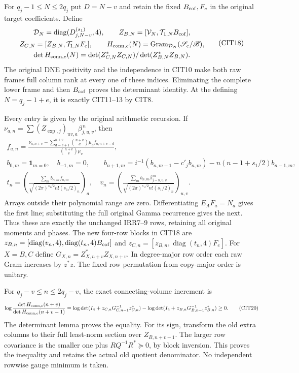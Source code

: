 \documentclass[10pt]{article}
\begin{document}
For $q_j-1\le N\le2q_j$ put $D=N-v$ and retain the fixed
$B_{\rm cof},F_e$ in the original target coefficients. Define
\[
 \begin{gathered}
 \mathcal D_N=\operatorname{diag}(D_{j,N-v}^{(s_1)},4),\qquad
 Z_{B,N}=[\mathcal V_N,\mathcal T_{1,N}B_{\rm cof}],\\
 Z_{C,N}=[Z_{B,N},\mathcal T_{1,N}F_e],\qquad
 H_{{\rm conn},e}(N)
   =\operatorname{Gram}_{\mathcal D_N}(\mathscr S_e/\mathscr B),\\
 \det H_{{\rm conn},e}(N)=\det(Z_{C,N}^*Z_{C,N})/
                                      \det(Z_{B,N}^*Z_{B,N}).
 \end{gathered}\tag{CIT18}
\]
The original DNE positivity and the independence in CIT10
make both raw frames full column rank at every one of these
indices. Eliminating the complete lower frame and then
$B_{\rm cof}$ proves the determinant identity. At the defining
$N=q_j-1+e$, it is exactly CIT11--13 by CIT8.

Every entry is given by the original arithmetic recursion.
If $\nu_{a,n}=\sum(Z_{\exp,j})_{uv,a}\beta_{j,u,v}^{\,n}$, then
\[
 \begin{gathered}
 f_{a,n}=
 \frac{\nu_{a,n+v}-\sum_{d=v+1}^{n+v}
                 \binom{n+v}{d}\mu_df_{a,n+v-d}}
      {\binom{n+v}{v}\mu_v},\\
 b_{0,m}=\mathbf1_{m=0},\quad b_{-1,m}=0,\qquad
 b_{n+1,m}=i^{-1}(b_{n,m-1}-c'_j b_{n,m})
                       -n(n-1+s_1/2)b_{n-1,m},\\
 t_n=\left(\frac{\sum_m b_{n,m}f_{a,m}}
                    {\sqrt{(2\pi)^{s_1/2}n!(s_1/2)_n}}\right)_a,
 \quad
 v_n=\left(\frac{\sum_m b_{n,m}\beta_{j-8,u,v}^{\,m}}
                    {\sqrt{(2\pi)^{s_1/2}n!(s_1/2)_n}}\right)_{u,v}.
 \end{gathered}\tag{CIT19}
\]
Arrays outside their polynomial range are zero. Differentiating
$E_AF_a=N_a$ gives the first line; substituting the full original
Gamma recurrence gives the next. Thus these are exactly the
unchanged IRR7--9 rows, retaining all original moments and phases.
The new four-row blocks in CIT18 are
$z_{B,n}=[\operatorname{diag}(v_n,4),
\operatorname{diag}(t_n,4)B_{\rm cof}]$ and
$z_{C,n}=[z_{B,n},\operatorname{diag}(t_n,4)F_e]$.
For $X=B,C$ define $G_{X,n}=Z_{X,n+v}^*Z_{X,n+v}$.
In degree-major row order each raw Gram increases by $z^*z$.
The fixed row permutation from copy-major order is unitary.

For $q_j-v\le n\le2q_j-v$, the exact connecting-volume increment is
\[
 \log\frac{\det H_{{\rm conn},e}(n+v)}
                   {\det H_{{\rm conn},e}(n+v-1)}
 =\log\det(I_4+z_{C,n}G_{C,n-1}^{-1}z_{C,n}^*)
  -\log\det(I_4+z_{B,n}G_{B,n-1}^{-1}z_{B,n}^*)\ge0 .
 \tag{CIT20}
\]
The determinant lemma proves the equality. For its sign,
transform the old extra columns to their full least-norm
section over $Z_{B,n+v-1}$. The larger row covariance is the
smaller one plus $R Q^{-1}R^*\succeq0$, by block inversion.
This proves the inequality and retains the actual old quotient
denominator. No independent rowwise gauge minimum is taken.
\end{document}
